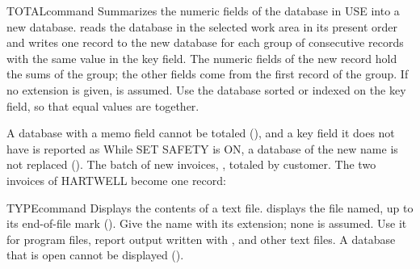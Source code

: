 \begin{XbaseEntry}{TOTAL}{command}
Summarizes the numeric fields of the database in USE into a new database.
\Syntax
{}
\Usage
{} reads the database in the selected work area in its present
order and writes one record to the new database for each group of
consecutive records with the same value in the key field.  The numeric
fields of the new record hold the sums of the group; the other fields come
from the first record of the group.  If no extension is given, 
is assumed.  Use the database sorted or indexed on the key field, so that
equal values are together.

A database with a memo field cannot be totaled (), and a key field it does not have is reported as
  While SET SAFETY is ON, a database of the new
name is not replaced ().
\Examples
The batch of new invoices, , totaled by customer.  The
two invoices of HARTWELL become one record:
\end{XbaseEntry}

\begin{XbaseEntry}{TYPE}{command}
Displays the contents of a text file.
\Syntax
{}
\Usage
{} displays the file named, up to its end-of-file mark
().  Give the name with its extension; none is assumed.  Use it
for program files, report output written with , and other text
files.  A database that is open cannot be displayed
().
\Examples
{}
\end{XbaseEntry}

